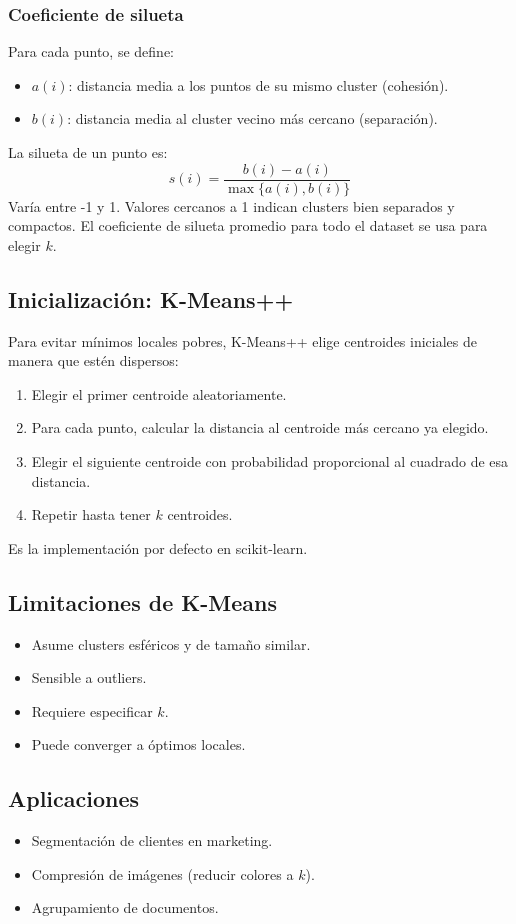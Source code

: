 \documentclass[12pt,a4paper,openany,oneside]{book}
\begin{document}
\subsubsection{Coeficiente de silueta}
Para cada punto, se define:
\begin{itemize}
    \item \(a(i)\): distancia media a los puntos de su mismo cluster (cohesión).
    \item \(b(i)\): distancia media al cluster vecino más cercano (separación).
\end{itemize}
La silueta de un punto es:
\[
s(i) = \frac{b(i) - a(i)}{\max\{a(i), b(i)\}}
\]
Varía entre -1 y 1. Valores cercanos a 1 indican clusters bien separados y compactos. El coeficiente de silueta promedio para todo el dataset se usa para elegir \(k\).

\subsection{Inicialización: K-Means++}
Para evitar mínimos locales pobres, K-Means++ elige centroides iniciales de manera que estén dispersos:
\begin{enumerate}
    \item Elegir el primer centroide aleatoriamente.
    \item Para cada punto, calcular la distancia al centroide más cercano ya elegido.
    \item Elegir el siguiente centroide con probabilidad proporcional al cuadrado de esa distancia.
    \item Repetir hasta tener \(k\) centroides.
\end{enumerate}
Es la implementación por defecto en scikit-learn.

\subsection{Limitaciones de K-Means}
\begin{itemize}
    \item Asume clusters esféricos y de tamaño similar.
    \item Sensible a outliers.
    \item Requiere especificar \(k\).
    \item Puede converger a óptimos locales.
\end{itemize}

\subsection{Aplicaciones}
\begin{itemize}
    \item Segmentación de clientes en marketing.
    \item Compresión de imágenes (reducir colores a \(k\)).
    \item Agrupamiento de documentos.
\end{itemize}
\end{document}
